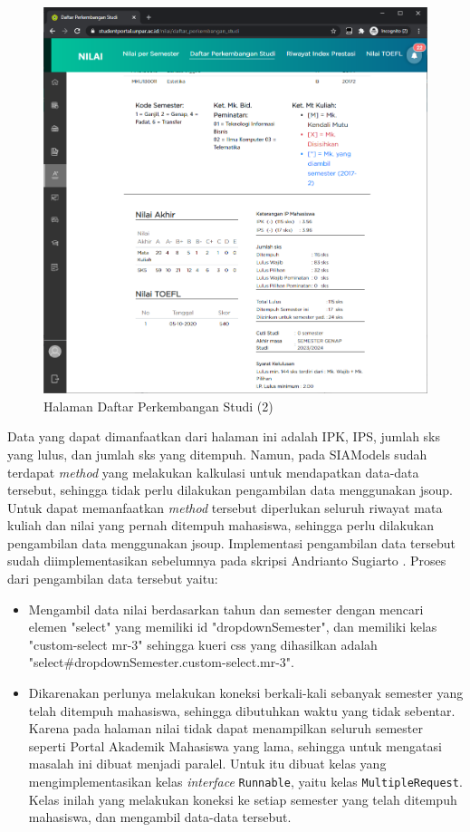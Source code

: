 \begin{itemize}
         \begin{figure}[H]
        	\centering
        	\includegraphics[scale=0.45]{Gambar/nilai_dps_2.png}
        	\caption{Halaman Daftar Perkembangan Studi (2)} 
        	\label{fig:3_dps_2}
        \end{figure}
        Data yang dapat dimanfaatkan dari halaman ini adalah IPK, IPS, jumlah sks yang lulus, dan jumlah sks yang ditempuh. Namun, pada SIAModels sudah terdapat \textit{method} yang melakukan kalkulasi untuk mendapatkan data-data tersebut, sehingga tidak perlu dilakukan pengambilan data menggunakan jsoup. Untuk dapat memanfaatkan \textit{method} tersebut diperlukan seluruh riwayat mata kuliah dan nilai yang pernah ditempuh mahasiswa, sehingga perlu dilakukan pengambilan data menggunakan jsoup.  Implementasi pengambilan data tersebut sudah diimplementasikan sebelumnya pada skripsi Andrianto Sugiarto \cite{ifstupor}. Proses dari pengambilan data tersebut yaitu:
        \begin{itemize}
            \item Mengambil data nilai berdasarkan tahun dan semester dengan mencari elemen "select" yang memiliki id "dropdownSemester", dan memiliki kelas "custom-select mr-3" sehingga kueri css yang dihasilkan adalah "select\#dropdownSemester.custom-select.mr-3".
            \item Dikarenakan perlunya melakukan koneksi berkali-kali sebanyak semester yang telah ditempuh mahasiswa, sehingga dibutuhkan waktu yang tidak sebentar. Karena pada halaman nilai tidak dapat menampilkan seluruh semester seperti Portal Akademik Mahasiswa yang lama, sehingga untuk mengatasi masalah ini dibuat menjadi paralel. Untuk itu dibuat kelas yang mengimplementasikan kelas \textit{interface} \texttt{Runnable}, yaitu kelas \texttt{MultipleRequest}. Kelas inilah yang melakukan koneksi ke setiap semester yang telah ditempuh mahasiswa, dan mengambil data-data tersebut.

\end{itemize}
\end{itemize}
